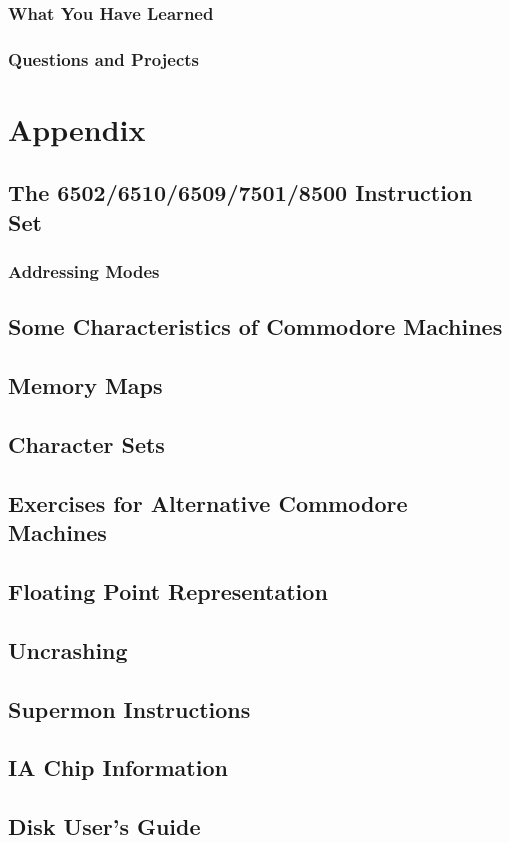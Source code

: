 \documentclass[11pt,a4paper,titlepage]{memoir}
\begin{document}
\section{What You Have Learned}
\section{Questions and Projects}
\appendix
\part{Appendix}
\chapter{The 6502/6510/6509/7501/8500 Instruction Set}
\section{Addressing Modes}
\blindtext
\chapter{Some Characteristics of Commodore Machines}
\blindtext
\chapter{Memory Maps}
\blindtext
\chapter{Character Sets}
\blindtext
\chapter{Exercises for Alternative Commodore Machines}
\label{app:e_251}
\blindtext
\chapter{Floating Point Representation}
\blindtext
\chapter{Uncrashing}
\blindtext
\chapter{Supermon Instructions}
\blindtext
\chapter{IA Chip Information}
\blindtext
\chapter{Disk User's Guide}
\blindtext
\end{document}
